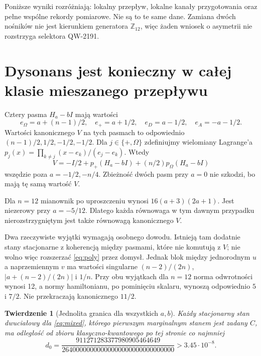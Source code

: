 \documentclass[11pt,a4paper]{article}
\newtheorem{theorem}{Twierdzenie}
\begin{document}
Poniższe wyniki rozróżniają: lokalny przepływ, lokalne kanały
przygotowania oraz pełne wspólne rekordy pomiarowe. Nie są to te same
dane. Zamiana dwóch nośników nie jest kierunkiem generatora $\mathbb Z_{12}$,
więc żaden wniosek o asymetrii nie rozstrzyga selektora QW-2191.

\section{Dysonans jest konieczny w całej klasie mieszanego przepływu}

Cztery pasma $H_a-bI$ mają wartości
\[
 e_\Omega=a+(n-1)/2,\quad e_+=a+1/2,\quad
 e_D=a-1/2,\quad e_A=-a-1/2.
\]
Wartości kanonicznego $V$ na tych pasmach to odpowiednio
$(n-1)/2,1/2,-1/2,-1/2$.
Dla $j\in\{+,\Omega\}$ zdefiniujmy wielomiany Lagrange'a
$p_j(x)=\prod_{k\ne j}(x-e_k)/(e_j-e_k)$.
Wtedy
\begin{equation}\label{eq:poly}
 V=-I/2+p_+(H_a-bI)+(n/2)p_\Omega(H_a-bI)
\end{equation}
wszędzie poza $a=-1/2,-n/4$.
Zbieżność dwóch pasm przy $a=0$ nie szkodzi, bo mają tę samą wartość $V$.

Dla $n=12$ mianownik po uproszczeniu wynosi
$16(a+3)(2a+1)$. Jest niezerowy przy $a=-5/12$.
Dlatego każda równowaga w tym dawnym przypadku nierozstrzygniętym
jest także równowagą kanonicznego $V$.

Dwa rzeczywiste wyjątki wymagają osobnego dowodu. Istnieją tam dodatnie
stany stacjonarne z koherencją między pasmami, które nie komutują z $V$;
nie wolno więc rozszerzać \eqref{eq:poly} przez domysł.
Jednak blok między jednorodnym $u$ a naprzemiennym $v$ ma wartości
singularne $(n-2)/(2n)$, $|a+(n-2)/(2n)|$ i $1/n$.
Przy obu wyjątkach dla $n=12$ norma odwrotności wynosi 12, a normy
hamiltonianu, po pominięciu skalaru, wynoszą odpowiednio $5$ i $7/2$.
Nie przekraczają kanonicznego $11/2$.

\begin{theorem}[Jednolita granica dla wszystkich $a,b$]\label{thm:mixed}
Każdy stacjonarny stan dwuciałowy dla \eqref{eq:mixed}, którego
pierwszym marginalnym stanem jest zadany $C$, ma odległość od
zbioru klasyczno-kwantowego po tej stronie co najmniej
\begin{equation}\label{eq:d0}
 d_0=\frac{911271283377980905464649}
 {26400000000000000000000000000000}>3.45\cdot10^{-8}.
\end{equation}
\end{theorem}
\end{document}

